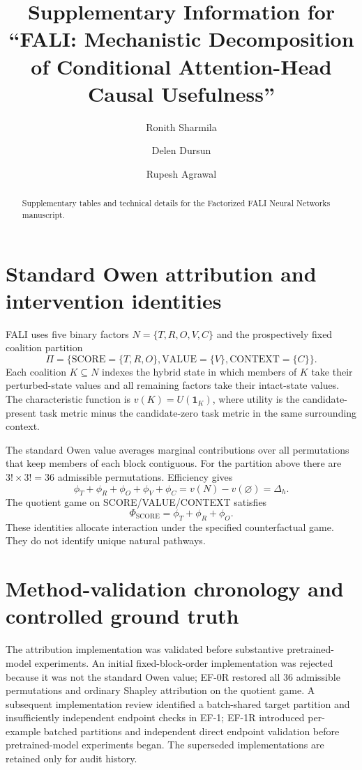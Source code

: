 \documentclass[preprint,12pt,authoryear]{elsarticle}
\begin{document}
\begin{frontmatter}
\title{Supplementary Information for ``FALI: Mechanistic Decomposition of Conditional Attention-Head Causal Usefulness''}
\author[inst1]{Ronith Sharmila}
\author[inst2]{Delen Dursun}
\author[inst3]{Rupesh Agrawal}
\begin{abstract}
Supplementary tables and technical details for the Factorized FALI Neural Networks manuscript.
\end{abstract}
\end{frontmatter}


\section{Standard Owen attribution and intervention identities}

FALI uses five binary factors $N=\{T,R,O,V,C\}$ and the prospectively fixed
coalition partition
\[
\Pi=\{\mathrm{SCORE}=\{T,R,O\},\mathrm{VALUE}=\{V\},\mathrm{CONTEXT}=\{C\}\}.
\]
Each coalition $K\subseteq N$ indexes the hybrid state in which members of $K$
take their perturbed-state values and all remaining factors take their intact-state
values. The characteristic function is $v(K)=U(\mathbf{1}_K)$, where utility is the
candidate-present task metric minus the candidate-zero task metric in the same
surrounding context.

The standard Owen value averages marginal contributions over all permutations
that keep members of each block contiguous. For the partition above there are
$3!\times 3!=36$ admissible permutations. Efficiency gives
\[
\phi_T+\phi_R+\phi_O+\phi_V+\phi_C
=v(N)-v(\varnothing)
=\Delta_h.
\]
The quotient game on SCORE/VALUE/CONTEXT satisfies
\[
\Phi_{\mathrm{SCORE}}=\phi_T+\phi_R+\phi_O.
\]
These identities allocate interaction under the specified counterfactual game.
They do not identify unique natural pathways.

\section{Method-validation chronology and controlled ground truth}

The attribution implementation was validated before substantive pretrained-model
experiments. An initial fixed-block-order implementation was rejected because it
was not the standard Owen value; EF-0R restored all 36 admissible permutations and
ordinary Shapley attribution on the quotient game. A subsequent implementation
review identified a batch-shared target partition and insufficiently independent
endpoint checks in EF-1; EF-1R introduced per-example batched partitions and
independent direct endpoint validation before pretrained-model experiments began.
The superseded implementations are retained only for audit history.
\end{document}
